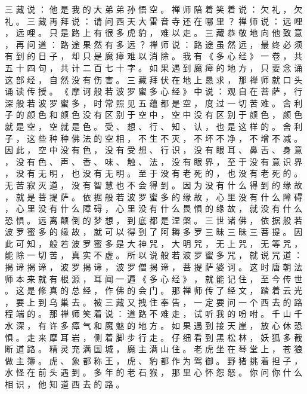 {三 藏 说 ： 他 是 我 的 大 弟 弟 孙 悟 空 。
禅 师 陪 着 笑 着 说 ： 欠 礼 ， 欠 礼 。
三 藏 再 拜 说 ： 请 问 西 天 大 雷 音 寺 还 在 哪 里 ？ 禅 师 说 ： 远 哩 ， 远 哩 。
只 是 路 上 有 很 多 虎 豹 ， 难 以 走 。
三 藏 恭 敬 地 向 他 致 意 ， 再 问 道 ： 路 途 果 然 有 多 远 ？ 禅 师 说 ： 路 途 虽 然 远 ， 最 终 必 须 有 到 的 日 子 ， 却 只 是 魔 瘴 难 以 消 除 。
我 有 《 多 心 经 》 一 卷 ， 共 五 十 四 句 ， 共 计 二 百 七 十 字 。
如 果 遇 到 魔 瘴 的 地 方 ， 只 要 念 诵 这 部 经 ， 自 然 没 有 伤 害 。
三 藏 拜 伏 在 地 上 恳 求 ， 那 禅 师 就 口 头 诵 读 传 授 。
《 摩 诃 般 若 波 罗 蜜 多 心 经 》 中 说 ： 观 自 在 菩 萨 ， 行 深 般 若 波 罗 蜜 多 ， 时 常 照 见 五 蕴 都 是 空 ， 度 过 一 切 苦 难 。
舍 利 子 的 颜 色 和 颜 色 没 有 区 别 于 空 中 ， 空 中 没 有 区 别 于 颜 色 ， 颜 色 就 是 空 ， 空 就 是 色 。
受 、 想 、 行 、 知 、 认 ， 也 是 这 样 的 。
舍 利 子 ， 这 些 种 种 佛 法 的 空 相 ， 不 生 不 灭 ， 不 坏 不 净 ， 不 增 不 减 。
因 此 ， 空 中 没 有 色 ， 没 有 受 想 、 行 识 ， 没 有 眼 耳 、 鼻 舌 、 身 意 ， 没 有 色 、 声 、 香 、 味 、 触 、 法 ， 没 有 眼 界 ， 至 于 没 有 意 识 界 ， 没 有 无 明 ， 也 没 有 无 明 。
至 于 没 有 老 死 的 ， 也 没 有 老 死 的 。
无 苦 寂 灭 道 ， 没 有 智 慧 也 不 会 得 到 。
因 为 没 有 什 么 得 到 的 缘 故 ， 就 是 菩 提 萨 。
依 据 般 若 波 罗 蜜 多 的 缘 故 ， 心 里 没 有 什 么 障 碍 ， 心 里 没 有 什 么 障 碍 ， 心 里 没 有 什 么 畏 惧 的 缘 故 ， 就 没 有 什 么 恐 惧 。
远 离 颠 倒 的 梦 想 ， 到 底 都 是 涅 槃 。
三 世 诸 佛 ， 依 据 般 若 波 罗 蜜 多 的 缘 故 ， 就 可 以 得 到 了 阿 耨 多 罗 三 昧 三 昧 三 菩 提 。
因 此 可 知 ， 般 若 波 罗 蜜 多 是 大 神 咒 ， 大 明 咒 ， 无 上 咒 ， 无 等 咒 ， 能 除 一 切 苦 ， 真 实 不 虚 。
所 以 说 般 若 波 罗 蜜 多 咒 ， 就 说 咒 道 ： 揭 谛 揭 谛 ， 波 罗 揭 谛 ， 波 罗 僧 揭 谛 ， 菩 提 萨 婆 诃 。 这 时 唐 朝 法 师 本 来 就 有 根 源 ， 耳 闻 一 遍 《 多 心 经 》 ， 就 能 记 住 ， 至 今 传 世 。
这 是 修 真 的 总 经 ， 作 佛 的 会 门 。
那 禅 师 传 了 经 文 ， 踏 着 云 光 ， 要 上 到 乌 巢 去 。
被 三 藏 又 拽 住 奉 告 ， 一 定 要 问 一 个 西 去 的 路 程 端 的 。
那 禅 师 笑 着 说 ： 道 路 不 难 走 ， 试 听 我 的 吩 咐 。
千 山 千 水 深 ， 有 许 多 瘴 气 和 魔 魅 的 地 方 。
如 果 遇 到 接 天 崖 ， 放 心 休 恐 惧 。
走 来 摩 耳 岩 ， 侧 着 脚 步 行 走 。
仔 细 看 到 黑 松 林 ， 妖 狐 多 截 断 道 路 。
精 灵 充 满 国 城 ， 魔 主 满 山 住 。
老 虎 坐 在 琴 堂 上 ， 苍 狼 做 主 簿 。
虎 、 象 都 称 王 ， 虎 、 豹 都 作 为 驾 御 。
野 猪 挑 着 担 子 ， 水 怪 在 前 头 遇 到 。
多 年 的 老 石 猴 ， 那 里 心 怀 怨 怒 。
你 问 你 什 么 相 识 ， 他 知 道 西 去 的 路 。
}
